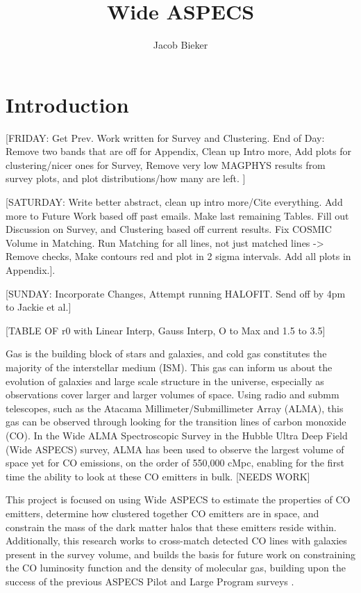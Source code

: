 \documentclass[twoside,single]{lion-msc}
\title{Wide ASPECS}
\author{Jacob Bieker}
\affiliation{Leiden Observatory, Leiden University}
\begin{document}
\maketitle

\setcounter{page}{2}
\tableofcontents
\cleardoublepage

\setcounter{page}{1}
\chapter{Introduction}

[FRIDAY: Get Prev. Work written for Survey and Clustering. End of Day: Remove two bands that are off for Appendix, Clean up Intro more, Add plots for clustering/nicer ones for Survey, Remove very low MAGPHYS results from survey plots, and plot distributions/how many are left. ]

[SATURDAY: Write better abstract, clean up intro more/Cite everything. Add more to Future Work based off past emails. Make last remaining Tables. Fill out Discussion on Survey, and Clustering based off current results. Fix COSMIC Volume in Matching. Run Matching for all lines, not just matched lines -> Remove checks, Make contours red and plot in 2 sigma intervals. Add all plots in Appendix.]. 

[SUNDAY: Incorporate Changes, Attempt running HALOFIT. Send off by 4pm to Jackie et al.] 

[TABLE OF r0 with Linear Interp, Gauss Interp, O to Max and 1.5 to 3.5]

Gas is the building block of stars and galaxies, and cold gas constitutes the majority of the interstellar medium (ISM). This gas can inform us about the evolution of galaxies and large scale structure in the universe, especially as observations cover larger and larger volumes of space. Using radio and submm telescopes, such as the Atacama Millimeter/Submillimeter Array (ALMA), this gas can be observed through looking for the transition lines of carbon monoxide (CO). In the Wide ALMA Spectroscopic Survey in the Hubble Ultra Deep Field (Wide ASPECS) survey, ALMA has been used to observe the largest volume of space yet for CO emissions, on the order of 550,000 cMpc, enabling for the first time the ability to look at these CO emitters in bulk. [NEEDS WORK]

This project is focused on using Wide ASPECS to estimate the properties of CO emitters, determine how clustered together CO emitters are in space, and constrain the mass of the dark matter halos that these emitters reside within. Additionally, this research works to cross-match detected CO lines with galaxies present in the survey volume, and builds the basis for future work on constraining the CO luminosity function and the density of molecular gas, building upon the success of the previous ASPECS Pilot and Large Program surveys \cite{walter2016alma, decarli2019alma}. 
\end{document}
